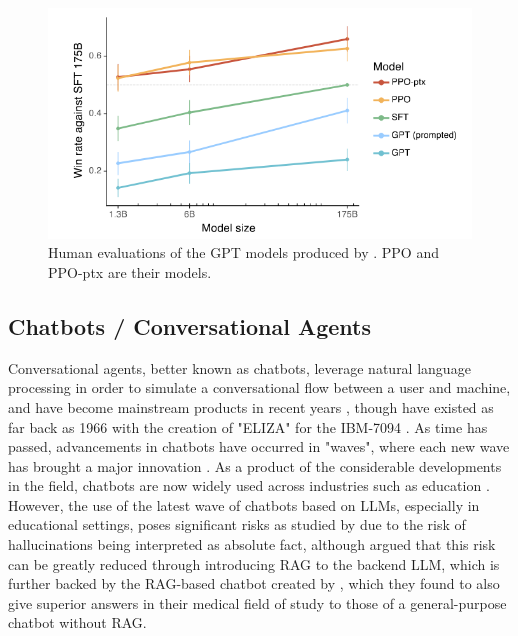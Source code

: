 \documentclass[12pt]{report}
\begin{document}
    \begin{figure}[H] 
        \centering
        \includegraphics[width=.8\linewidth]{ouyangLLMPreference.png}
        \caption{Human evaluations of the GPT models produced by \textcite{ouyang_training_2022}. PPO and PPO-ptx are their models.}
        \label{fig:LLMPref}
    \end{figure}


    \subsection{Chatbots / Conversational Agents}

    Conversational agents, better known as chatbots, leverage natural language processing in order to simulate a conversational flow 
    between a user and machine, and have become mainstream products in recent years \autocite{liao_all_2018},
    though have existed as far back as 1966 with the creation of "ELIZA" for the IBM-7094 \autocite{weizenbaum_elizacomputer_1966}.
    As time has passed, advancements in chatbots have occurred in "waves", where each new wave has brought a major innovation \autocite{schobel_charting_2024}.
    As a product of the considerable developments in the field, chatbots are now widely used 
    across industries such as education \autocite{kuhail_interacting_2023}. However, the use of the latest wave of chatbots based on LLMs,
    especially in educational settings, poses significant risks as studied by \textcite{neumann_llm-driven_2024}
    due to the risk of hallucinations being interpreted as absolute fact, although \textcite{shuster_retrieval_2021} 
    argued that this risk can be greatly reduced through introducing RAG to the backend LLM, which is further backed 
    by the RAG-based chatbot created by \textcite{ge_development_2023}, which they found to also give superior answers
    in their medical field of study to those of a general-purpose chatbot without RAG.  
\end{document}
